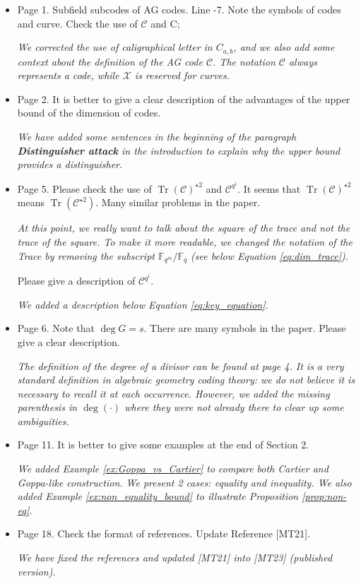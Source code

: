 \documentclass[12pt,a4paper]{amsart}
\DeclareMathOperator{\trace}{Tr}
\newcommand{\calC}{\mathcal{C}}
\newcommand{\calX}{\mathcal{X}}
\newcommand{\Tr}[1]{\trace\!\left(#1\right)}
\begin{document}
\begin{itemize}
 
\item  Page 1. Subfield subcodes of AG codes. Line -7. Note the symbols of codes and curve. Check the use of $\calC$ and C; 

\textit{We corrected the use of caligraphical letter in $C_{a,b}$, and we also add some context about the definition of the AG code $\calC$. The notation $\calC$ always represents a code, while $\calX$ is reserved for curves.}
 
\item Page 2. It is better to give a clear description of the advantages of the upper bound of the dimension of codes.

\textit{We have added some sentences in the beginning of the paragraph \textbf{Distinguisher attack} in the introduction to explain why the upper bound provides a distinguisher.}


\item  Page 5. Please check the use of $\Tr{\calC}^{\star 2}$ and $\calC^{q^i}$. It seems that $\Tr{\calC}^{\star 2}$ means $\Tr{\calC^{\star 2}}$. Many similar problems in the paper.

\textit{At this point, we really want to talk about the square of the trace and not the trace of the square. To make it more readable, we changed the notation of the Trace by removing the subscript $\mathbb{F}_{q^m}/\mathbb{F}_q$ (see below Equation \eqref{eq:dim_trace}).}

\noindent Please give a description of $\calC^{q^i}$.
 
\textit{We added a description below Equation \eqref{eq:key_equation}.}

\item Page 6. Note that $\deg G = s$. There are many symbols in the paper. Please give a clear description.

\textit{The definition of the degree of a divisor can be found at page 4. It is a very standard definition in algebraic geometry coding theory: we do not believe it is necessary to recall it at each occurrence. However, we added the missing parenthesis in $\deg\left(\cdot\right)$ where they were not already there to clear up some ambiguities.}


\item Page 11. It is better to give some examples at the end of Section 2.

\textit{We added Example \ref{ex:Goppa_vs_Cartier} to compare both Cartier and Goppa-like construction. We present 2 cases: equality and inequality. We also added Example \ref{ex:non_equality_bound} to illustrate Proposition \ref{prop:non-eq}.}



\item Page 18. Check the format of references. Update Reference [MT21].

\textit{We have fixed the references and updated [MT21] into [MT23] (published version).}

\end{itemize} 
\end{document}

